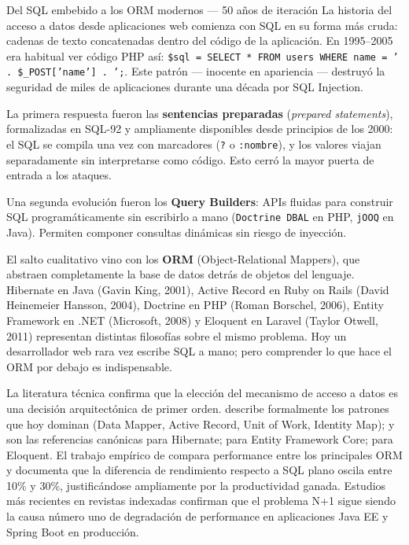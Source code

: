 \begin{cajahistoria}{Del SQL embebido a los ORM modernos --- 50 años de iteración}
La historia del acceso a datos desde aplicaciones web comienza con SQL
en su forma más cruda: cadenas de texto concatenadas dentro del código
de la aplicación. En 1995--2005 era habitual ver código PHP así:
\texttt{\$sql =  SELECT * FROM users WHERE name = ' . \$\_POST['name'] .  ';}.
Este patrón --- inocente en apariencia --- destruyó la seguridad de
miles de aplicaciones durante una década por SQL Injection.

La primera respuesta fueron las \textbf{sentencias preparadas}
(\emph{prepared statements}), formalizadas en SQL-92 y ampliamente
disponibles desde principios de los 2000: el SQL se compila una vez
con marcadores (\texttt{?} o \texttt{:nombre}), y los valores viajan
separadamente sin interpretarse como código. Esto cerró la mayor
puerta de entrada a los ataques.

Una segunda evolución fueron los \textbf{Query Builders}: APIs
fluidas para construir SQL programáticamente sin escribirlo a mano
(\texttt{Doctrine DBAL} en PHP, \texttt{jOOQ} en Java). Permiten
componer consultas dinámicas sin riesgo de inyección.

El salto cualitativo vino con los \textbf{ORM} (Object-Relational
Mappers), que abstraen completamente la base de datos detrás de
objetos del lenguaje. Hibernate en Java (Gavin King, 2001), Active
Record en Ruby on Rails (David Heinemeier Hansson, 2004), Doctrine en
PHP (Roman Borschel, 2006), Entity Framework en .NET (Microsoft, 2008)
y Eloquent en Laravel (Taylor Otwell, 2011) representan distintas
filosofías sobre el mismo problema. Hoy un desarrollador web rara vez
escribe SQL a mano; pero comprender lo que hace el ORM por debajo es
indispensable.

La literatura técnica confirma que la elección del mecanismo de
acceso a datos es una decisión arquitectónica de primer orden.
\cite{fowler2002patterns} describe formalmente los patrones que hoy
dominan (Data Mapper, Active Record, Unit of Work, Identity Map);
\cite{ottinger2017hibernate} y \cite{bauer2015java} son las
referencias canónicas para Hibernate; \cite{smith2018entity} para
Entity Framework Core; \cite{otwell2024laravel} para Eloquent. El
trabajo empírico de \cite{salah2017orm} compara performance entre
los principales ORM y documenta que la diferencia de rendimiento
respecto a SQL plano oscila entre 10\% y 30\%, justificándose
ampliamente por la productividad ganada. Estudios más recientes
\cite{ottinger2017hibernate} en revistas indexadas confirman que el problema
N+1 sigue siendo la causa número uno de degradación de performance
en aplicaciones Java EE y Spring Boot en producción.
\end{cajahistoria}

